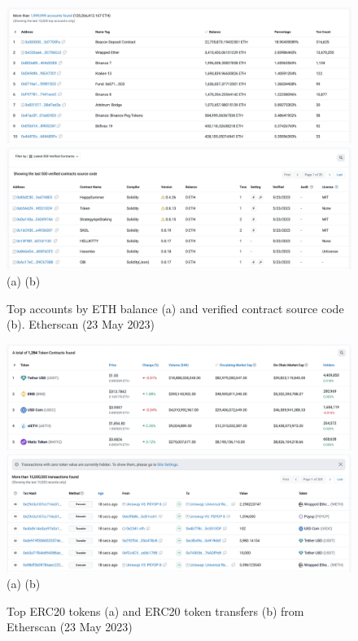 \documentclass[UTF8]{article}
\begin{document}
{\begin{figure}[htbp]
\begin{center}
\includegraphics[width=0.48\linewidth]{images/accounts}
\includegraphics[width=0.48\linewidth]{images/contracts} \\
(a)\hspace{160pt}        (b)\\
\caption{Top accounts by ETH balance (a) and verified contract source code (b). Etherscan (23 May 2023)}
\label{fig:accounts}
\end{center}
\end{figure}

\begin{figure}[htbp]
\begin{center}
\includegraphics[width=0.48\linewidth]{images/erc20}
\includegraphics[width=0.48\linewidth]{images/xfrs} \\
(a)\hspace{160pt}        (b)\\
\caption{Top ERC20 tokens (a) and ERC20 token transfers (b) from Etherscan (23 May 2023)}
\label{fig:erc20}
\end{center}
\end{figure}

}
\end{document}
